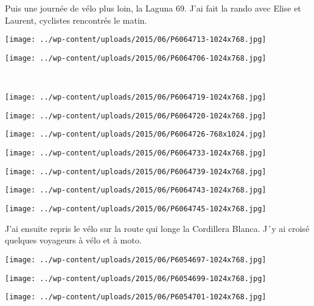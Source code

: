 Puis une journée de vélo plus loin, la Laguna 69. J'ai fait la rando avec Elise et Laurent, cyclistes rencontrés le matin. 
\begin{center} \texttt{[image: ../wp-content/uploads/2015/06/P6064713-1024x768.jpg]} \end{center}
\begin{center} \texttt{[image: ../wp-content/uploads/2015/06/P6064706-1024x768.jpg]} \end{center}
\vspace{-\topsep}
\vspace{-2.75mm}
\pagebreak
~\\
\begin{center} \texttt{[image: ../wp-content/uploads/2015/06/P6064719-1024x768.jpg]} \end{center}
\begin{center} \texttt{[image: ../wp-content/uploads/2015/06/P6064720-1024x768.jpg]} \end{center}
\begin{center} \texttt{[image: ../wp-content/uploads/2015/06/P6064726-768x1024.jpg]} \end{center}
\begin{center} \texttt{[image: ../wp-content/uploads/2015/06/P6064733-1024x768.jpg]} \end{center}
\begin{center} \texttt{[image: ../wp-content/uploads/2015/06/P6064739-1024x768.jpg]} \end{center}
\begin{center} \texttt{[image: ../wp-content/uploads/2015/06/P6064743-1024x768.jpg]} \end{center}
\begin{center} \texttt{[image: ../wp-content/uploads/2015/06/P6064745-1024x768.jpg]} \end{center}

J'ai ensuite repris le vélo sur la route qui longe la Cordillera Blanca. J´y ai croisé quelques voyageurs à vélo et à moto. 
\begin{center} \texttt{[image: ../wp-content/uploads/2015/06/P6054697-1024x768.jpg]} \end{center}
\begin{center} \texttt{[image: ../wp-content/uploads/2015/06/P6054699-1024x768.jpg]} \end{center}
\vfill
\begin{center} \texttt{[image: ../wp-content/uploads/2015/06/P6054701-1024x768.jpg]} \end{center}
\vspace{-\topsep}
\vspace{-0.75mm}
\pagebreak

